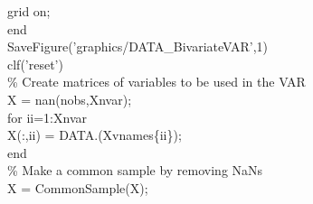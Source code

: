 \hspace{1mm}\hspace{5mm} \hspace{5mm} \hspace{5mm} grid on;  \\ 
\hspace{1mm}\hspace{5mm} \hspace{5mm} \textcolor{matlabblue}{end} \\ 
\hspace{1mm}\hspace{5mm} \hspace{5mm} SaveFigure(\textcolor{matlabpurple}{'graphics/DATA\_BivariateVAR'},1) \\ 
\hspace{1mm}\hspace{5mm} \hspace{5mm} clf(\textcolor{matlabpurple}{'reset'}) \\ 
\hspace{1mm}\hspace{5mm} \hspace{5mm} \textcolor{matlabgreen}{\% Create matrices of variables to be used in the VAR }\\ 
\hspace{1mm}\hspace{5mm} \hspace{5mm} X = nan(nobs,Xnvar); \\ 
\hspace{1mm}\hspace{5mm} \hspace{5mm} \textcolor{matlabblue}{for} ii=1:Xnvar \\ 
\hspace{1mm}\hspace{5mm} \hspace{5mm} \hspace{5mm} X(:,ii) = DATA.(Xvnames\{ii\}); \\ 
\hspace{1mm}\hspace{5mm} \hspace{5mm} \textcolor{matlabblue}{end} \\ 
\hspace{1mm}\hspace{5mm} \hspace{5mm} \textcolor{matlabgreen}{\% Make a common sample by removing NaNs }\\ 
\hspace{1mm}\hspace{5mm} \hspace{5mm} X = CommonSample(X); \\ 
